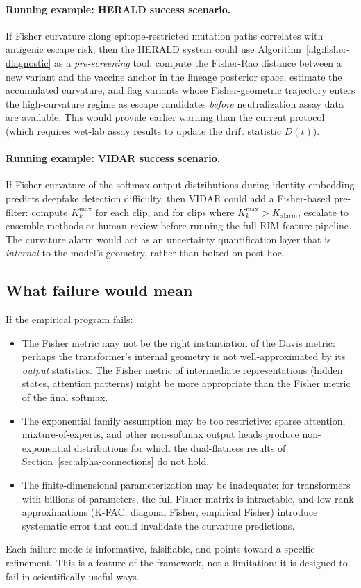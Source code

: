 \documentclass[11pt]{article}
\theoremstyle{remark}
\begin{document}
\paragraph{Running example: HERALD success scenario.}
If Fisher curvature along epitope-restricted mutation paths correlates with
antigenic escape risk, then the HERALD system could use
Algorithm~\ref{alg:fisher-diagnostic} as a \emph{pre-screening} tool: compute
the Fisher-Rao distance between a new variant and the vaccine anchor in the
lineage posterior space, estimate the accumulated curvature, and flag variants
whose Fisher-geometric trajectory enters the high-curvature regime as escape
candidates \emph{before} neutralization assay data are available.  This would
provide earlier warning than the current protocol (which requires wet-lab assay
results to update the drift statistic $D(t)$).

\paragraph{Running example: VIDAR success scenario.}
If Fisher curvature of the softmax output distributions during identity
embedding predicts deepfake detection difficulty, then VIDAR could add a
Fisher-based pre-filter: compute $K_k^{\max}$ for each clip, and for clips
where $K_k^{\max} > K_{\mathrm{alarm}}$, escalate to ensemble methods or
human review before running the full RIM feature pipeline.  The curvature
alarm would act as an uncertainty quantification layer that is \emph{internal}
to the model's geometry, rather than bolted on post hoc.

\subsection{What failure would mean}

If the empirical program fails:
\begin{itemize}
  \item The Fisher metric may not be the right instantiation of the Davis
  metric: perhaps the transformer's internal geometry is not
  well-approximated by its \emph{output} statistics.  The Fisher metric
  of intermediate representations (hidden states, attention patterns) might
  be more appropriate than the Fisher metric of the final softmax.
  \item The exponential family assumption may be too restrictive: sparse
  attention, mixture-of-experts, and other non-softmax output heads
  produce non-exponential distributions for which the dual-flatness results
  of Section~\ref{sec:alpha-connections} do not hold.
  \item The finite-dimensional parameterization may be inadequate: for
  transformers with billions of parameters, the full Fisher matrix is
  intractable, and low-rank approximations (K-FAC, diagonal Fisher,
  empirical Fisher) introduce systematic error that could invalidate
  the curvature predictions.
\end{itemize}
Each failure mode is informative, falsifiable, and points toward a specific
refinement.  This is a feature of the framework, not a limitation: it is
designed to fail in scientifically useful ways.
\end{document}
